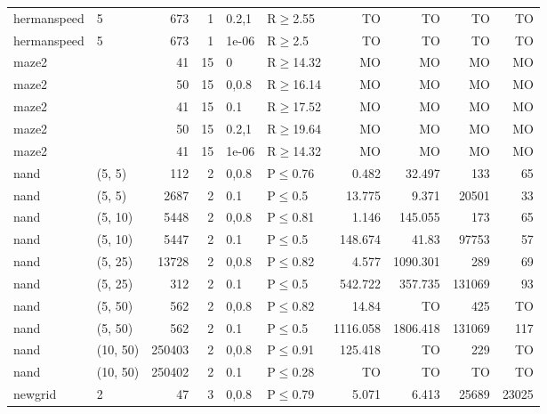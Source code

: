 \begin{longtable}{llrrllrrrr}
 hermanspeed   & 5        &    	673 &   1 & 0.2,1 & R$\geq$2.55  & TO       & TO       & TO      & TO     \\
 hermanspeed   & 5        &    	673 &   1 & 1e-06 & R$\geq$2.5   & TO       & TO       & TO      & TO     \\
 maze2         &          &     	41 &  15 & 0     & R$\geq$14.32 & MO       & MO       & MO      & MO     \\
 maze2         &          &     	50 &  15 & 0,0.8 & R$\geq$16.14 & MO       & MO       & MO      & MO     \\
 maze2         &          &     	41 &  15 & 0.1   & R$\geq$17.52 & MO       & MO       & MO      & MO     \\
 maze2         &          &     	50 &  15 & 0.2,1 & R$\geq$19.64 & MO       & MO       & MO      & MO     \\
 maze2         &          &     	41 &  15 & 1e-06 & R$\geq$14.32 & MO       & MO       & MO      & MO     \\
 nand          & (5, 5)   &    	112 &   2 & 0,0.8 & P$\leq$0.76  & 0.482    & 32.497   & 133     & 65     \\
 nand          & (5, 5)   &   	2687 &   2 & 0.1   & P$\leq$0.5   & 13.775   & 9.371    & 20501   & 33     \\
 nand          & (5, 10)  &   	5448 &   2 & 0,0.8 & P$\leq$0.81  & 1.146    & 145.055  & 173     & 65     \\
 nand          & (5, 10)  &   	5447 &   2 & 0.1   & P$\leq$0.5   & 148.674  & 41.83    & 97753   & 57     \\
 nand          & (5, 25)  &  	13728 &   2 & 0,0.8 & P$\leq$0.82  & 4.577    & 1090.301 & 289     & 69     \\
 nand          & (5, 25)  &    	312 &   2 & 0.1   & P$\leq$0.5   & 542.722  & 357.735  & 131069  & 93     \\
 nand          & (5, 50)  &    	562 &   2 & 0,0.8 & P$\leq$0.82  & 14.84    & TO       & 425     & TO     \\
 nand          & (5, 50)  &    	562 &   2 & 0.1   & P$\leq$0.5   & 1116.058 & 1806.418 & 131069  & 117    \\
 nand          & (10, 50) & 	250403 &   2 & 0,0.8 & P$\leq$0.91  & 125.418  & TO       & 229     & TO     \\
 nand          & (10, 50) & 	250402 &   2 & 0.1   & P$\leq$0.28  & TO       & TO       & TO      & TO     \\
 newgrid       & 2        &     	47 &   3 & 0,0.8 & P$\leq$0.79  & 5.071    & 6.413    & 25689   & 23025  \\

\end{longtable}
